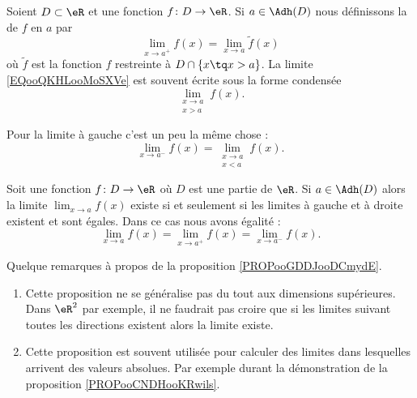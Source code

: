 \begin{definition}
    Soient \( D\subset \eR\) et une fonction \( f\colon D\to \eR\). Si \( a\in \Adh(D)\) nous définissons la  de \( f\) en \( a\) par
    \begin{equation}        \label{EQooQKHLooMoSXVe}
        \lim_{x\to a^+} f(x)=\lim_{x\to a} \tilde f(x)
    \end{equation}
    où \( \tilde f\) est la fonction \( f\) restreinte à \( D\cap\{ x\tq x>a \}\). La limite \eqref{EQooQKHLooMoSXVe} est souvent écrite sous la forme condensée
    \begin{equation}
        \lim_{\substack{x\to a\\x>a}}f(x).
    \end{equation}

    Pour la limite à gauche c'est un peu la même chose :
    \begin{equation}
        \lim_{x\to a^-} f(x)=\lim_{\substack{x\to a\\x<a}}f(x).
    \end{equation}
\end{definition}

\begin{proposition}      \label{PROPooGDDJooDCmydE}
    Soit une fonction \( f\colon D\to \eR\) où \( D\) est une partie de \( \eR\). Si \( a\in \Adh(D)\) alors la limite \( \lim_{x\to a} f(x)\) existe si et seulement si les limites à gauche et à droite existent et sont égales. Dans ce cas nous avons égalité :
    \begin{equation}
        \lim_{x\to a} f(x)=\lim_{x\to a^+} f(x)=\lim_{x\to a^-} f(x).
    \end{equation}
\end{proposition}

\begin{normaltext}
    Quelque remarques à propos de la proposition \ref{PROPooGDDJooDCmydE}.
    \begin{enumerate}
        \item
            
    Cette proposition ne se généralise pas du tout aux dimensions supérieures. Dans \( \eR^2\) par exemple, il ne faudrait pas croire que si les limites suivant toutes les directions existent alors la limite existe.
\item
    Cette proposition est souvent utilisée pour calculer des limites dans lesquelles arrivent des valeurs absolues. Par exemple durant la démonstration de la proposition \ref{PROPooCNDHooKRwils}.
    \end{enumerate}
\end{normaltext}


